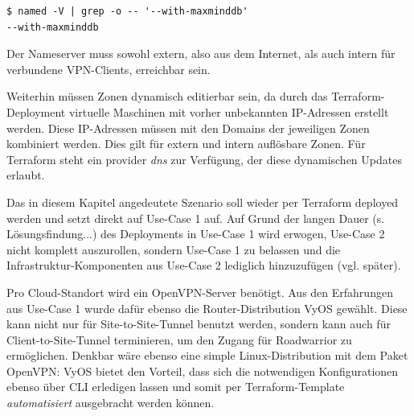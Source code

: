 \begin{lstlisting}[label=bind-mmdb-compiler-flag,caption=Das Ubuntu 20.04 Standardpaket wurde bereits mit dem Flag kompiliert.]
$ named -V | grep -o -- '--with-maxminddb'
--with-maxminddb
\end{lstlisting}


Der Nameserver muss sowohl extern, also aus dem Internet, als auch intern für verbundene VPN-Clients, erreichbar sein.

Weiterhin müssen Zonen dynamisch editierbar sein, da durch das Terraform-Deployment virtuelle Maschinen mit vorher unbekannten IP-Adressen erstellt werden. Diese IP-Adressen müssen mit den Domains der jeweiligen Zonen kombiniert werden. Dies gilt für extern und intern auflösbare Zonen. Für Terraform steht ein provider \textit{dns} zur Verfügung, der diese dynamischen Updates erlaubt.

Das in diesem Kapitel angedeutete Szenario soll wieder per Terraform deployed werden und setzt direkt auf Use-Case 1 auf. Auf Grund der langen Dauer (s. Lösungsfindung...) des Deployments in Use-Case 1 wird erwogen, Use-Case 2 nicht \glqq komplett\grqq{} auszurollen, sondern Use-Case 1 zu belassen und die Infrastruktur-Komponenten aus Use-Case 2 lediglich hinzuzufügen (vgl. später).

Pro Cloud-Standort wird ein OpenVPN-Server benötigt. Aus den Erfahrungen aus Use-Case 1 wurde dafür ebenso die Router-Distribution VyOS gewählt. Diese kann nicht nur für Site-to-Site-Tunnel benutzt werden, sondern kann auch für Client-to-Site-Tunnel terminieren, um den Zugang für Roadwarrior zu ermöglichen. Denkbar wäre ebenso eine simple Linux-Distribution mit dem Paket OpenVPN: VyOS bietet den Vorteil, dass sich die notwendigen Konfigurationen ebenso über CLI erledigen lassen und somit per Terraform-Template \textit{automatisiert} ausgebracht werden können.
%

